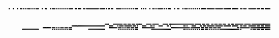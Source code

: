 \documentclass[10pt]{article}
\theoremstyle{plain}
\theoremstyle{definition}
\begin{document}
\begin{table*}[b]
{\begin{minipage}{5.32in}
\[\begin{array}{@{}r@{}}
\begin{array}{@{}l@{}}
\a\a\a\b\a\a\a\b\a\a\a\b\a\a\b\b\a\b\a\b\a\b\b\b\a\b\a\b\a\b\b\b\a\a\a\b \a\a\b\b\a\a\a\b\a\b\b\b\a\b\a\b\a\b\a\b\a\b\a\b\a\b\b\b\b\a\a\b\b\a\b\b \b\a\a\b\b\a\b\b\b\b\b\b\b\b\b\b\b\b\a\b\b\b\b\b\a\b\a\b\b\a\b\b\a\a\a\b \b\b\b\b\a\b\a\b\a\b\a\b\a\b\a\b\a\b\b\b\a\a\a\b\a\b\a\b\a\a\a\b\a\a\b\b \a\b\a\b\b\b\b\b\a\b\a\b\a\b\b\b\a\a\a\b\a\a\b\b\a\a\a\b\a\b\b\b\a\b\a\b \a\b\a\b\a\b\a\b\a\b\b\b\b\b\a\b\b\b\b\b\b\b\a\b\b\b\b\b\b\b\a\b\b\b\b\b \b\b\a\b\b\b\b\b\b\a\a\b\b\a\b\b\b\a\a\b\b\b\b\b\b\b\a\b\b\b\a\b\b\b\a\b \b\b\b\b
\end{array}
\mynnl
\begin{array}{@{}l@{}}
\a\a\a\a\a\a\a\a\a\a\a\a\a\a\a\a\a\a\a\a\a\a\a\a\a\a\a\a\a\a\a\a\a\a\a\a \a\a\a\a\a\a\a\a\a\a\a\a\a\a\a\a\a\a\a\a\a\a\a\a\a\a\a\a\a\a\a\a\a\a\a\a \a\a\a\a\a\a\a\a\a\a\a\a\a\a\a\a\a\a\a\a\a\a\a\a\b\b\b\b\a\a\a\a\b\b\b\b \b\b\b\b\b\a\b\b\b\a\b\b\b\a\b\b\b\a\b\b\b\b\b\b\a\a\a\a\b\b\b\b\b\a\b\b \b\b\b\b\a\a\a\a\b\b\b\b\b\a\b\b\b\b\b\b\b\b\b\b\b\b\b\b\b\b\b\b\b\b\b\b \b\b\a\b\b\b\b\b\b\a\b\b\b\a\b\b\b\a\a\b\b\a\b\b\b\a\b\b\b\a\b\b\b\a\a\b \b\a\b\b\b\a\b\b\b\b\b\b\b\b\a\b\b\b\b\b\b\a\b\b\b\b\b\b\b\b\b\b\b\b\b\b \b\b\b\b\mynl
\a\a\a\a\a\a\a\a\a\a\a\a\a\a\a\a\a\a\a\a\a\a\a\a\a\a\a\a\a\a\a\a\a\a\a\a \a\a\a\a\a\a\a\a\a\a\a\a\a\a\a\a\a\a\a\a\a\a\a\a\a\a\a\a\b\b\b\b\b\b\b\b \b\b\b\b\b\b\b\b\b\b\b\b\b\b\b\b\b\b\b\b\b\b\b\b\a\a\a\a\b\b\b\b\a\a\a\a \b\a\b\b\b\b\a\b\b\b\b\b\b\b\a\b\b\b\a\b\a\a\a\a\b\b\b\b\a\a\a\a\b\b\a\b \a\a\a\a\b\b\b\b\a\a\a\a\b\b\a\b\a\a\a\a\a\a\a\a\a\a\a\a\b\b\a\b\a\a\a\a \b\b\b\b\a\a\a\a\b\b\a\b\b\b\a\b\b\b\b\b\b\b\a\b\b\b\b\b\b\b\a\b\b\b\b\b \b\b\a\b\b\b\b\b\b\a\a\b\b\a\b\b\b\a\a\b\b\b\b\b\b\b\a\b\b\b\a\b\b\b\a\b \b\b\b\b\mynl
\a\a\a\a\a\a\a\a\a\a\a\a\a\a\a\a\a\a\a\a\a\a\a\a\a\a\a\a\a\a\a\a\a\a\a\a \b\b\b\b\b\b\b\b\a\b\b\b\a\b\a\b\a\b\b\b\a\b\b\b\a\b\b\b\a\a\a\a\a\a\a\a \a\a\a\a\a\a\a\a\a\a\a\a\a\a\a\a\a\a\a\a\a\a\a\a\a\a\a\a\b\b\b\b\b\b\b\b \a\b\b\b\a\b\a\b\a\b\b\b\a\b\b\b\a\b\b\b\a\a\a\a\b\b\b\b\b\b\b\b\b\b\b\b \a\a\a\a\a\a\a\a\a\a\a\a\a\a\a\a\b\b\b\b\b\b\b\b\b\b\b\b\b\b\b\b\b\b\a\b \b\b\b\b\b\b\b\b\a\b\b\b\a\b\b\b\a\b\b\b\a\b\b\b\a\b\b\b\a\a\a\a\a\a\a\a \a\a\a\a\a\a\a\a\b\b\a\b\b\b\b\b\b\b\b\b\a\b\b\b\b\b\b\b\b\b\b\b\b\b\b\b \b\b\b\b\mynl
\a\a\a\a\a\a\a\a\a\a\a\a\a\a\a\a\b\b\b\b\b\b\b\b\b\b\b\b\b\b\b\b\a\a\a\a \a\a\a\a\a\a\a\a\a\b\a\b\a\b\a\b\a\b\a\b\a\b\a\b\a\b\b\b\a\a\a\a\a\a\a\a \a\a\a\a\a\a\a\a\b\b\b\b\b\b\b\b\b\b\b\b\b\b\b\b\a\a\a\a\a\a\a\a\a\a\a\a \a\b\a\b\a\b\a\b\a\b\a\b\a\b\a\b\a\b\b\b\a\a\a\a\a\a\a\a\a\a\a\a\a\b\b\b \b\b\b\b\b\b\b\b\b\b\b\b\b\b\b\b\a\a\a\a\a\a\a\a\a\a\a\a\b\b\a\b\a\b\a\b \a\b\a\b\a\b\a\b\a\b\b\b\a\b\b\b\a\b\a\b\a\b\a\b\a\b\a\b\b\b\b\b\b\b\b\b \b\b\b\b\b\b\b\b\b\b\a\b\a\a\a\a\a\a\a\a\a\b\a\b\b\b\a\b\b\b\a\b\b\b\a\b \b\b\b\b\mynl

\end{array}
\end{array}\]
\end{minipage}}
\end{table*}
\end{document}

